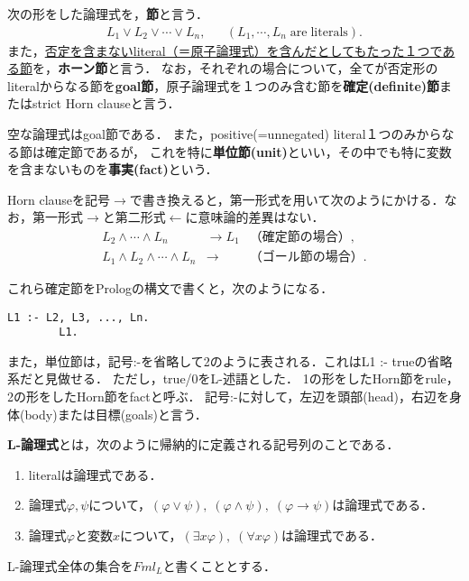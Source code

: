 \documentclass[uplatex,dvipdfmx]{jsarticle}
\begin{document}
\begin{definition}
    次の形をした論理式を，\textbf{節}と言う．
    \begin{align*}
        L_1\lor L_2\lor\cdots\lor L_n, && (L_1,\cdots,L_n\mathrm{\;are\;literals}).
    \end{align*}
    また，\underline{否定を含まないliteral（＝原子論理式）を含んだとしてもたった１つである節}を，\textbf{ホーン節}と言う．
    なお，それぞれの場合について，全てが否定形のliteralからなる節を\textbf{goal節}，原子論理式を１つのみ含む節を\textbf{確定(definite)節}またはstrict Horn clauseと言う．
\end{definition}
\begin{example}
    空な論理式はgoal節である．
    また，positive(=unnegated) literal１つのみからなる節は確定節であるが，
    これを特に\textbf{単位節(unit)}といい，その中でも特に変数を含まないものを\textbf{事実(fact)}という．
\end{example}
\begin{remark}
    Horn clauseを記号$\to$で書き換えると，第一形式を用いて次のようにかける．なお，第一形式$\to$と第二形式$\leftarrow$に意味論的差異はない．
    \begin{align*}
        L_2\land\cdots\land L_n &\to L_1 &（確定節の場合）,\\
        L_1\land L_2\land\cdots\land L_n &\to &（ゴール節の場合）.
    \end{align*}
\end{remark}
\begin{remark}[Prologでは]
    これら確定節をPrologの構文で書くと，次のようになる．
    \begin{lstlisting}[caption=Prolog]
        L1 :- L2, L3, ..., Ln.
        L1.
    \end{lstlisting}
    また，単位節は，記号:-を省略して2のように表される．これはL1 :- trueの省略系だと見做せる．
    ただし，true/0をL-述語とした．
    1の形をしたHorn節をrule，2の形をしたHorn節をfactと呼ぶ．
    記号:-に対して，左辺を頭部(head)，右辺を身体(body)または目標(goals)と言う．
\end{remark}

\begin{definition}[formula]
    \textbf{L-論理式}とは，次のように帰納的に定義される記号列のことである．
    \begin{enumerate}
        \item literalは論理式である．
        \item 論理式$\varphi,\psi$について，$(\varphi\lor\psi),\;(\varphi\land\psi),\;(\varphi\to\psi)$は論理式である．
        \item 論理式$\varphi$と変数$x$について，$(\exists x\varphi),\;(\forall x\varphi)$は論理式である．
    \end{enumerate}
    L-論理式全体の集合を$Fml_L$と書くこととする．
\end{definition}
\end{document}
